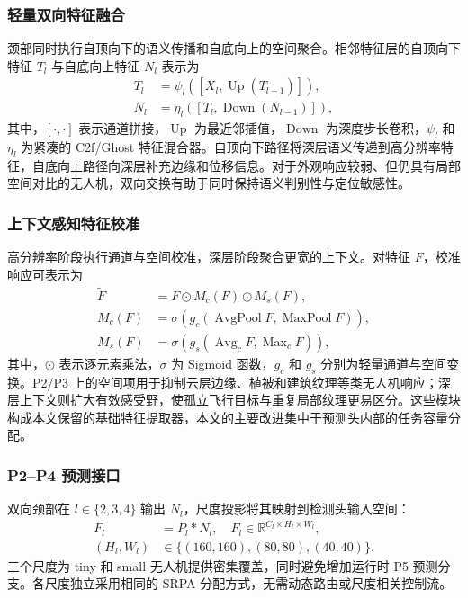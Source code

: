\subsubsection{轻量双向特征融合}
颈部同时执行自顶向下的语义传播和自底向上的空间聚合。相邻特征层的自顶向下特征 $T_l$ 与自底向上特征 $N_l$ 表示为
\begin{equation}
\begin{aligned}
T_l&=\psi_l\!\left(\left[X_l,\operatorname{Up}(T_{l+1})\right]\right),\\
N_l&=\eta_l\!\left(\left[T_l,\operatorname{Down}(N_{l-1})\right]\right),
\end{aligned}
\label{eq:neck}
\end{equation}
其中，$[\cdot,\cdot]$ 表示通道拼接，$\operatorname{Up}$ 为最近邻插值，$\operatorname{Down}$ 为深度步长卷积，$\psi_l$ 和 $\eta_l$ 为紧凑的 C2f/Ghost 特征混合器。自顶向下路径将深层语义传递到高分辨率特征，自底向上路径向深层补充边缘和位移信息。对于外观响应较弱、但仍具有局部空间对比的无人机，双向交换有助于同时保持语义判别性与定位敏感性。

\subsubsection{上下文感知特征校准}
高分辨率阶段执行通道与空间校准，深层阶段聚合更宽的上下文。对特征 $F$，校准响应可表示为
\begin{equation}
\begin{aligned}
\widetilde{F}&=F\odot M_c(F)\odot M_s(F),\\
M_c(F)&=\sigma\!\left(g_c(\operatorname{AvgPool}F,\operatorname{MaxPool}F)\right),\\
M_s(F)&=\sigma\!\left(g_s(\operatorname{Avg}_cF,\operatorname{Max}_cF)\right),
\end{aligned}
\label{eq:refinement}
\end{equation}
其中，$\odot$ 表示逐元素乘法，$\sigma$ 为 Sigmoid 函数，$g_c$ 和 $g_s$ 分别为轻量通道与空间变换。P2/P3 上的空间项用于抑制云层边缘、植被和建筑纹理等类无人机响应；深层上下文则扩大有效感受野，使孤立飞行目标与重复局部纹理更易区分。这些模块构成本文保留的基础特征提取器，本文的主要改进集中于预测头内部的任务容量分配。

\subsubsection{P2--P4 预测接口}
双向颈部在 $l\in\{2,3,4\}$ 输出 $N_l$，尺度投影将其映射到检测头输入空间：
\begin{equation}
\begin{aligned}
F_l&=P_l*N_l,\quad F_l\in\mathbb{R}^{C_l\times H_l\times W_l},\\
(H_l,W_l)&\in\{(160,160),(80,80),(40,40)\}.
\end{aligned}
\label{eq:headinput}
\end{equation}
三个尺度为 tiny 和 small 无人机提供密集覆盖，同时避免增加运行时 P5 预测分支。各尺度独立采用相同的 SRPA 分配方式，无需动态路由或尺度相关控制流。

